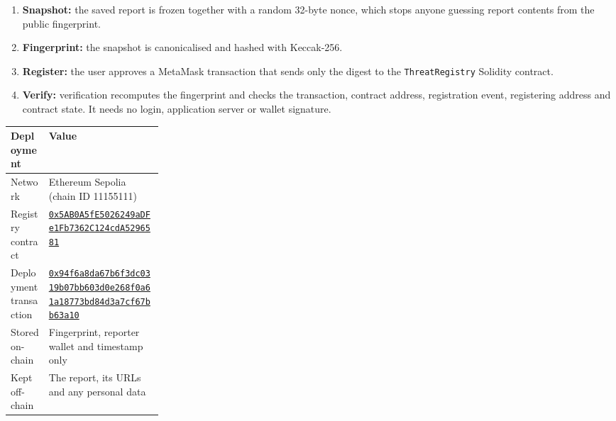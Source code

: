 \documentclass[11pt,a4paper]{article}
\begin{document}
\begin{enumerate}
\item \textbf{Snapshot:} the saved report is frozen together with a random 32-byte nonce, which stops anyone guessing report contents from the public fingerprint.
\item \textbf{Fingerprint:} the snapshot is canonicalised and hashed with Keccak-256.
\item \textbf{Register:} the user approves a MetaMask transaction that sends only the digest to the \nolinkurl{ThreatRegistry} Solidity contract.
\item \textbf{Verify:} verification recomputes the fingerprint and checks the transaction, contract address, registration event, registering address and contract state. It needs no login, application server or wallet signature.
\end{enumerate}
\begin{tabularx}{\linewidth}{@{}>{\raggedright\arraybackslash}p{0.250\linewidth}>{\raggedright\arraybackslash}X@{}}
\toprule
\textbf{Deployment} & \textbf{Value} \\
\midrule
Network & Ethereum Sepolia (chain ID 11155111) \\
Registry contract & \href{https://sepolia.etherscan.io/address/0x5AB0A5fE5026249aDFe1Fb7362C124cdA5296581}{\nolinkurl{0x5AB0A5fE5026249aDFe1Fb7362C124cdA5296581}} \\
Deployment transaction & \href{https://sepolia.etherscan.io/tx/0x94f6a8da67b6f3dc0319b07bb603d0e268f0a61a18773bd84d3a7cf67bb63a10}{\nolinkurl{0x94f6a8da67b6f3dc0319b07bb603d0e268f0a61a18773bd84d3a7cf67bb63a10}} \\
Stored on-chain & Fingerprint, reporter wallet and timestamp only \\
Kept off-chain & The report, its URLs and any personal data \\
\bottomrule
\end{tabularx}
\vspace{4pt}
\end{document}
